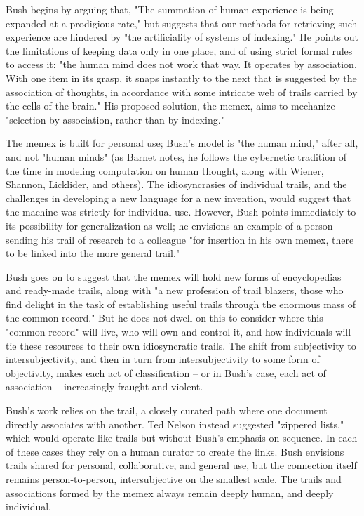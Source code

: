Bush begins by arguing that, "The summation of human experience is being expanded at a prodigious rate," but suggests that our methods for retrieving such experience are hindered by "the artificiality of systems of indexing."  He points out the limitations of keeping data only in one place, and of using strict formal rules to access it: "the human mind does not work that way. It operates by association. With one item in its grasp, it snaps instantly to the next that is suggested by the association of thoughts, in accordance with some intricate web of trails carried by the cells of the brain." His proposed solution, the memex, aims to mechanize "selection by association, rather than by indexing." 

The memex is built for personal use; Bush's model is "the human mind," after all, and not "human minds" (as Barnet notes, he follows the cybernetic tradition of the time in modeling computation on human thought, along with Wiener, Shannon, Licklider, and others).  The idiosyncrasies of individual trails, and the challenges in developing a new language for a new invention, would suggest that the machine was strictly for individual use. However, Bush points immediately to its possibility for generalization as well; he envisions an example of a person sending his trail of research to a colleague "for insertion in his own memex, there to be linked into the more general trail." 

Bush goes on to suggest that the memex will hold new forms of encyclopedias and ready-made trails, along with "a new profession of trail blazers, those who find delight in the task of establishing useful trails through the enormous mass of the common record."  But he does not dwell on this to consider where this "common record" will live, who will own and control it, and how individuals will tie these resources to their own idiosyncratic trails. The shift from subjectivity to intersubjectivity, and then in turn from intersubjectivity to some form of objectivity, makes each act of classification – or in Bush's case, each act of association – increasingly fraught and violent.

Bush's work relies on the trail, a closely curated path where one document directly associates with another. Ted Nelson instead suggested "zippered lists," which would operate like trails but without Bush's emphasis on sequence.  In each of these cases they rely on a human curator to create the links. Bush envisions trails shared for personal, collaborative, and general use, but the connection itself remains person-to-person, intersubjective on the smallest scale. The trails and associations formed by the memex always remain deeply human, and deeply individual.

